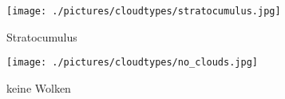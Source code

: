 \begin{figure}[h]
\begin{subfigure}[b]{0.31\textwidth}
		\label{fig:nimbostratus}
		\end{subfigure}
		\begin{subfigure}[b]{0.31\textwidth}
		\begin{center}
				\texttt{[image: ./pictures/cloudtypes/stratocumulus.jpg]}
		\end{center}
		\caption{Stratocumulus}
		\label{fig:stratocumulus}
		\end{subfigure}
		\begin{subfigure}[b]{0.31\textwidth}
		\begin{center}
				\texttt{[image: ./pictures/cloudtypes/no\_clouds.jpg]}
		\end{center}
		\caption{keine Wolken}
		\label{fig:no_clouds}
		\end{subfigure}
		\caption{}
		\label{fig:}
\end{figure}
